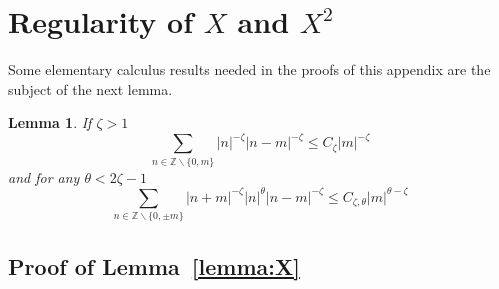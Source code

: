 \documentclass[a4paper,12pt,reqno]{article}
\newcommand{\ZZ}{\mathbb{Z}}
\newtheorem{lemma}[theorem]{Lemma}
\begin{document}
\appendix
\section{Regularity of $X$ and $X^2$}
\label{sec:reg}


Some elementary calculus results needed in the proofs of this appendix are the
subject of the next lemma.

\begin{lemma}
\label{lemma:sums}
If $\zeta > 1$ 
$$
\sum_{n\in \ZZ \backslash \{0, m \}}
    |n|^{-\zeta} |n-m|^{-\zeta} \le C_\zeta |m|^{-\zeta}
$$
and for any $\theta < 2\zeta-1$
$$
\sum_{n\in \ZZ \backslash \{0,\pm m \}}
    |n+m|^{-\zeta} |n|^{\theta} |n-m|^{-\zeta} \le C_{\zeta,\theta} |m|^{\theta-\zeta}
$$  
\end{lemma}

\subsection{Proof of Lemma~\ref{lemma:X}}
\end{document}
